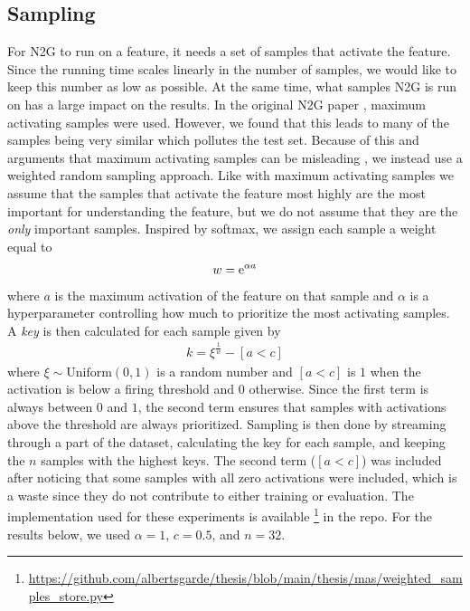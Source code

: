 \subsection{Sampling}
\label{sec:sampling}
For \ac{N2G} to run on a feature, it needs a set of samples that activate the feature.
Since the running time scales linearly in the number of samples, we would like to keep this number as low as possible.
At the same time, what samples \ac{N2G} is run on has a large impact on the results.
In the original \ac{N2G} paper \parencite{foote_neuron_2023}, maximum activating samples were used.
However, we found that this leads to many of the samples being very similar which pollutes the test set.
Because of this and arguments that maximum activating samples can be misleading \parencite{bolukbasi_interpretability_2021}, we instead use a weighted random sampling approach.
Like with maximum activating samples we assume that the samples that activate the feature most highly are the most important for understanding the feature, but we do not assume that they are the \emph{only} important samples.
Inspired by softmax, we assign each sample a weight equal to
\begin{align*}
    w=\mathrm{e}^{\alpha a}
\end{align*}
where $a$ is the maximum activation of the feature on that sample and $\alpha$ is a hyperparameter controlling how much to prioritize the most activating samples.
A \emph{key} is then calculated for each sample given by
\begin{align*}
    k=\xi^{\frac1w}-[a<c]
\end{align*}
where $\xi\sim\mathrm{Uniform}(0,1)$ is a random number and $[a<c]$ is $1$ when the activation is below a firing threshold and $0$ otherwise.
Since the first term is always between $0$ and $1$, the second term ensures that samples with activations above the threshold are always prioritized.
Sampling is then done by streaming through a part of the dataset, calculating the key for each sample, and keeping the $n$ samples with the highest keys.
The second term ($[a<c]$) was included after noticing that some samples with all zero activations were included, which is a waste since they do not contribute to either training or evaluation.
The implementation used for these experiments is available \footnote{\url{https://github.com/albertsgarde/thesis/blob/main/thesis/mas/weighted_samples_store.py}} in the repo.
For the results below, we used $\alpha=1$, $c=0.5$, and $n=32$.

